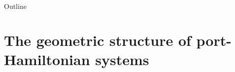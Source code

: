 \documentclass[aspectratio=169]{beamer}
\begin{document}
	
	
	\begin{frame}[plain]
		
		
		
	\end{frame}
	
	
	\begin{frame}{Outline}
		
		\tableofcontents
		
	\end{frame}


\section{The geometric structure of port-Hamiltonian systems}

\end{document}

